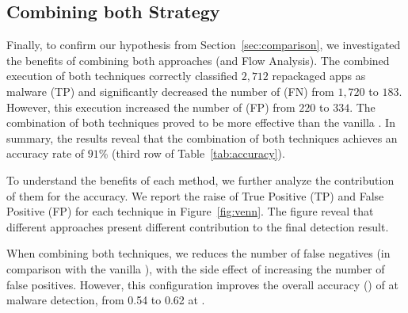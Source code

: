 \subsection{Combining both Strategy}\label{sec:strategy}

Finally, to confirm our hypothesis from Section~\ref{sec:comparison}, we investigated the benefits of combining both approaches (\mas and Flow Analysis). The combined execution of both techniques correctly classified $2,712$ repackaged apps as malware (TP) and significantly decreased the number of (FN) from $1,720$ to $183$. However, this execution increased the number of (FP) from $220$ to $334$. The combination of both techniques proved to be more effective than the vanilla \mas. In summary, the results reveal that the combination of both techniques achieves an accuracy rate of $91$\% (third row of Table~\ref{tab:accuracy}).

To understand the benefits of each method, we further analyze the contribution of them for the accuracy. We report the raise of True Positive (TP) and False Positive (FP) for each technique in Figure~\ref{fig:venn}. The figure reveal that different approaches present different contribution to the final detection result.

\begin{finding}
When combining both techniques, we reduces the number of
false negatives (in comparison with the vanilla \mas), with the side
effect of increasing the number of false positives. However, this configuration
improves the overall accuracy (\fone) of \mas at malware detection,
from 0.54 to 0.62 at \cds.
\end{finding}

